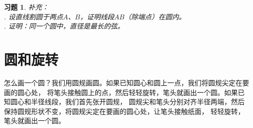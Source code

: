 \documentclass[12pt,UTF8]{ctexbook}
\newtheorem{xt}{习题}[section]
\begin{document}

\begin{xt}\label{xt:0-0-0}
    补充：\\
    . 设直线割圆于两点$A$、$B$，证明线段$AB$（除端点）在圆内。\\
    . 证明：同一个圆中，直径是最长的弦。
\end{xt}

\section{圆和旋转}
怎么画一个圆？我们用圆规画圆。如果已知圆心和圆上一点，我们将圆规尖定在要画的圆心处，
将笔头接触圆上的点，然后轻轻旋转，笔头就画出一个圆。如果已知圆心和半径线段，我们首先张开圆规，
圆规尖和笔头分别对齐半径两端，然后保持圆规形状不变，将圆规尖定在要画的圆心处，让笔头接触纸面，
轻轻旋转，笔头就画出一个圆。
\end{document}
